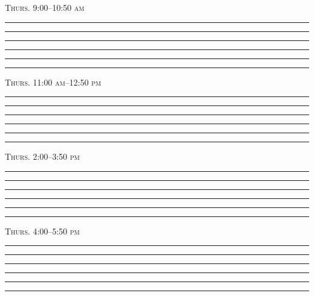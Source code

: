 \documentclass[11pt]{article}
\begin{document}
\begin{multicols}{2}

\textsc{Thurs. 9:00–10:50 am}\vspace*{0.5cm}

\rule{2.5in}{0.4pt}\vspace*{0.5cm}

\rule{2.5in}{0.4pt}\vspace*{0.5cm}

\rule{2.5in}{0.4pt}\vspace*{0.5cm}

\rule{2.5in}{0.4pt}\vspace*{0.5cm}

\rule{2.5in}{0.4pt}\vspace*{0.5cm}

\rule{2.5in}{0.4pt}\vspace*{0.5cm}


\textsc{Thurs. 11:00 am–12:50 pm}\vspace*{0.5cm}

\rule{2.5in}{0.4pt}\vspace*{0.5cm}

\rule{2.5in}{0.4pt}\vspace*{0.5cm}

\rule{2.5in}{0.4pt}\vspace*{0.5cm}

\rule{2.5in}{0.4pt}\vspace*{0.5cm}

\rule{2.5in}{0.4pt}\vspace*{0.5cm}

\rule{2.5in}{0.4pt}\vspace*{0.5cm}

\columnbreak

\textsc{Thurs. 2:00–3:50 pm}\vspace*{0.5cm}

\rule{2.5in}{0.4pt}\vspace*{0.5cm}

\rule{2.5in}{0.4pt}\vspace*{0.5cm}

\rule{2.5in}{0.4pt}\vspace*{0.5cm}

\rule{2.5in}{0.4pt}\vspace*{0.5cm}

\rule{2.5in}{0.4pt}\vspace*{0.5cm}

\rule{2.5in}{0.4pt}\vspace*{0.5cm}


\textsc{Thurs. 4:00–5:50 pm}\vspace*{0.5cm}

\rule{2.5in}{0.4pt}\vspace*{0.5cm}

\rule{2.5in}{0.4pt}\vspace*{0.5cm}

\rule{2.5in}{0.4pt}\vspace*{0.5cm}

\rule{2.5in}{0.4pt}\vspace*{0.5cm}

\rule{2.5in}{0.4pt}\vspace*{0.5cm}

\rule{2.5in}{0.4pt}\vspace*{0.5cm}


\end{multicols}
\end{document}
